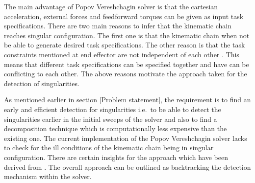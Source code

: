 The main advantage of Popov Vereshchagin solver is that the cartesian acceleration, external forces and feedforward torques can be given as input task specifications. There are two main reasons to infer that the kinematic chain reaches singular configuration. The first one is that the kinematic chain when not be able to generate desired task specifications. The other reason is that the task constraints mentioned at end effector are not independent of each other \cite{shakhimardanov2015composable}. This means that different task specifications can be specified together and have can be conflicting to each other. The above reasons motivate the approach taken for the detection of singularities. 



As mentioned earlier in section \ref{Problem statement}, the requirement is to find an early and efficient detection for singularities i.e.\ to be able to detect the singularities earlier in the initial sweeps of the solver and also to find a decomposition technique which is computationally less expensive than the existing one. The current implementation of the Popov Vereshchagin solver lacks to check for the ill conditions of the kinematic chain being in singular configuration. There are certain insights for the approach which have been derived from \cite{shakhimardanov2015composable}. The overall approach can be outlined as backtracking the detection mechanism within the solver. 


